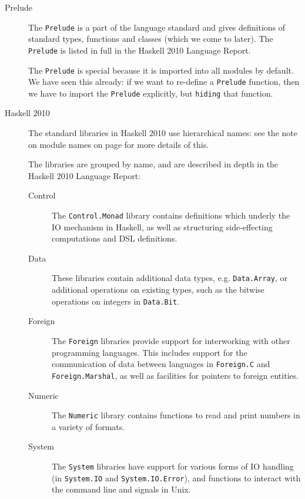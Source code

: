 \begin{description}
\item[Prelude] 
The \texttt{Prelude} is a part of the language standard and gives definitions of standard types, functions and classes (which we come to later). The \texttt{Prelude} is listed in full in the Haskell 2010 Language Report.

The \texttt{Prelude} is special because it is imported into all modules by default. We have seen this already: if we want to re-define a \texttt{Prelude} function, then we have to import the \texttt{Prelude} explicitly, but \texttt{hiding} that function.

\item[Haskell 2010] 
The standard libraries in Haskell 2010 use hierarchical names: see the note on module names on page \pageref{note-names} for more details of this. 

The libraries are grouped by name, and are described in depth in the Haskell 2010 Language Report:
\begin{description}
\item[Control]
The \texttt{Control.Monad} library contains definitions which underly the IO mechanism in Haskell, as well as structuring side-effecting computations and DSL definitions.
\item[Data]
These libraries contain additional data types, e.g. \texttt{Data.Array}, or additional operations on existing types, such as the bitwise operations on integers in \texttt{Data.Bit}.
\item[Foreign]
The \texttt{Foreign} libraries provide support for interworking with other programming languages. This includes support for the communication of data between languages in \texttt{Foreign.C} and \texttt{Foreign.Marshal}, as well as facilities for pointers to foreign entities.
\item[Numeric]
The \texttt{Numeric} library contains functions to read and print numbers in a variety of formats.
\item[System]
The \texttt{System} libraries have support for various forms of IO handling (in \texttt{System.IO} and \texttt{System.IO.Error}), and functions to interact with the command line and signals in Unix.
\end{description}


\end{description}
